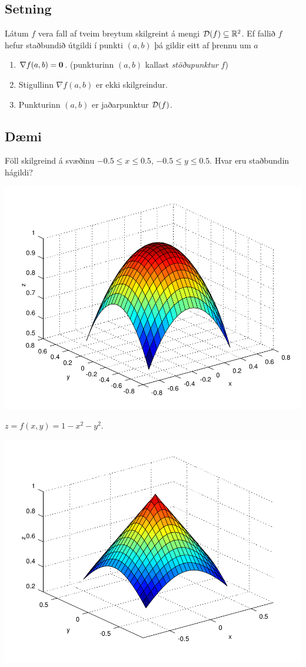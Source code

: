 \documentclass[a4paper,10pt,icelandic]{sphinxmanual}
\begin{document}
\subsection{Setning}
\label{Kafli3:setning}
Látum \(f\) vera fall af tveim breytum skilgreint á mengi
\({\cal D}(f)\subseteq {\mathbb  R}^2\). Ef fallið \(f\) hefur
staðbundið útgildi í punkti \((a,b)\) þá gildir eitt af þrennu um
\(a\)
\begin{enumerate}
\item {} 
\(\nabla f(a,b)=\mbox{${\bf 0}$}\). (punkturinn \((a,b)\)
kallast \emph{stöðupunktur} \(f\))

\item {} 
Stigullinn \(\nabla f(a,b)\) er ekki skilgreindur.

\item {} 
Punkturinn \((a,b)\) er jaðarpunktur \({\cal D}(f)\).

\end{enumerate}


\subsection{Dæmi}
\label{Kafli3:daemi}
Föll skilgreind á svæðinu \(-0.5 \leq x \leq 0.5\),
\(-0.5 \leq y \leq 0.5\). Hvar eru staðbundin hágildi?

{\hfill\includegraphics[width=0.600\linewidth]{peak_smooth.png}\hfill}

\(z = f(x,y) = 1-x^2-y^2\).

{\hfill\includegraphics[width=0.600\linewidth]{peak.png}\hfill}
\end{document}
